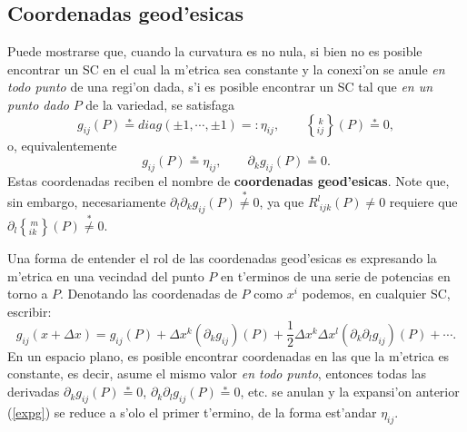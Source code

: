 %


\subsection{Coordenadas geod'esicas}\label{secCG}

Puede mostrarse que, cuando la curvatura es no nula, si bien no es posible encontrar un SC en el cual la m'etrica sea constante y la conexi'on se anule \textit{en todo punto} de una regi'on dada, s'i es posible encontrar un SC tal que \textit{en un punto dado} $P$ de la variedad, se satisfaga
\begin{equation}
 g_{ij}(P)\overset{\ast}{=}diag(\pm 1,\cdots,\pm 1)=:\eta_{ij}, \qquad \left\{_{ij}^{\,
k}\right\}(P) \overset{\ast}{=}0,
\end{equation}
o, equivalentemente
\begin{equation}
 g_{ij}(P)\overset{\ast}{=}\eta_{ij}, \qquad \partial_k
g_{ij}(P) \overset{\ast}{=}0. \label{cg1}
\end{equation}
Estas coordenadas reciben el nombre de \textbf{coordenadas geod'esicas}.
Note que, sin embargo, necesariamente $\partial_l\partial_k g_{ij}(P)\overset{\ast}{\neq}0$, ya que $R_{\
ijk}^l(P)\neq0$ requiere que $\partial_l\left\{
_{ik}^{\,m}\right\}(P)\overset{\ast}{\neq}0$.

Una forma de entender el rol de las coordenadas geod'esicas es expresando la m'etrica en una vecindad del punto $P$ en t'erminos de una serie de potencias en torno a $P$. Denotando las coordenadas de $P$ como $x^i$ podemos, en cualquier SC, escribir:
\begin{equation}
 g_{ij}(x+\Delta x)=g_{ij}(P)+\Delta x^k(\partial_kg_{ij})(P)+\frac{1}{2}\Delta x^k\Delta x^l(\partial_k\partial_lg_{ij})(P)+\cdots . \label{expg}
\end{equation}
En un espacio plano, es posible encontrar coordenadas en las que la m'etrica es constante, es decir, asume el mismo valor \textit{en todo punto}, entonces todas las derivadas $\partial_kg_{ij}(P)\stackrel{*}{=}0$, $\partial_k\partial_lg_{ij}(P)\stackrel{*}{=}0$, etc. se anulan y la expansi'on anterior (\ref{expg}) se reduce a s'olo el primer t'ermino, de la forma est'andar $\eta_{ij}$.

